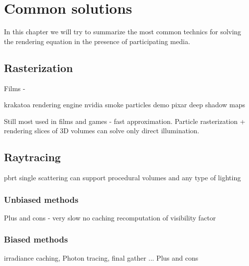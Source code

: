 \chapter{Common solutions}
In this chapter we will try to summarize the most common technics for solving the rendering equation in the presence of participating media.

\section{ Rasterization}
Films - 

krakatoa rendering engine
nvidia smoke particles demo
pixar deep shadow maps

Still most used in films and games - fast approximation.
Particle rasterization + rendering slices of 3D volumes can solve only direct illumination.
\section{Raytracing}
pbrt single scattering
can support procedural volumes and any type of lighting
\subsection{Unbiased methods}
Plus and cons - very slow no caching recomputation of visibility factor
\subsection{Biased methods}
irradiance caching, Photon tracing, final gather ...
Plus and cons


